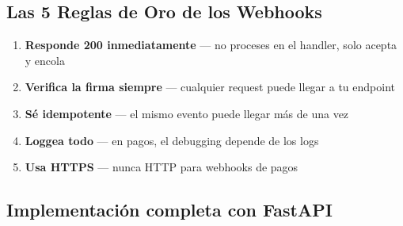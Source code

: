 \documentclass[11pt,a4paper]{article}
\begin{document}
\subsection{Las 5 Reglas de Oro de los Webhooks}

\begin{enumerate}
  \item \textbf{Responde 200 inmediatamente} — no proceses en el handler, solo acepta y encola
  \item \textbf{Verifica la firma siempre} — cualquier request puede llegar a tu endpoint
  \item \textbf{Sé idempotente} — el mismo evento puede llegar más de una vez
  \item \textbf{Loggea todo} — en pagos, el debugging depende de los logs
  \item \textbf{Usa HTTPS} — nunca HTTP para webhooks de pagos
\end{enumerate}

\subsection{Implementación completa con FastAPI}
\end{document}
